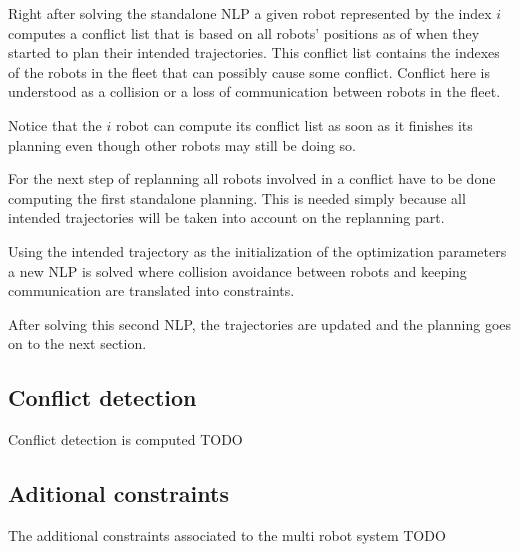 \documentclass[eprint]{actapoly}
\begin{document}
Right after solving the standalone NLP a given robot represented by the index $i$ computes a conflict list that is based on 
all robots' positions as of when they started to plan their intended trajectories. This conflict list contains the indexes of
the robots in the fleet that can possibly cause some conflict. Conflict here is understood as a collision or a loss of communication
between robots in the fleet.

Notice that the $i$ robot can compute its conflict list as soon as it finishes its planning even though other robots may still be doing so.

For the next step of replanning all robots involved in a conflict have to be done computing the first standalone planning. This is needed simply because
all intended trajectories will be taken into account on the replanning part.

Using the intended trajectory as the initialization of the optimization parameters a new NLP is solved where collision avoidance between robots
and keeping communication are translated into constraints.

After solving this second NLP, the trajectories are updated and the planning goes on to the next section.


\subsection{Conflict detection}

Conflict detection is computed TODO

\subsection{Aditional constraints}

The additional constraints associated to the multi robot system TODO
\end{document}
